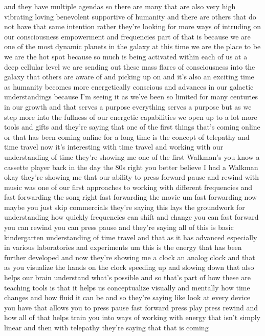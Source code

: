 \documentclass{article}
\begin{document}
and they have multiple agendas so there are many that are also very high
vibrating loving benevolent supportive of humanity and there are others
that do not have that same intention rather they're looking for more
ways of intruding on our consciousness empowerment and frequencies part
of that is because we are one of the most dynamic planets in the galaxy
at this time we are the place to be we are the hot spot because so much
is being activated within each of us at a deep cellular level we are
sending out these mass flares of consciousness into the galaxy that
others are aware of and picking up on and it's also an exciting time as
humanity becomes more energetically conscious and advances in our
galactic understandings because I'm seeing it as we've been so limited
for many centuries in our growth and that serves a purpose everything
serves a purpose but as we step more into the fullness of our energetic
capabilities we open up to a lot more tools and gifts and they're saying
that one of the first things that's coming online or that has been
coming online for a long time is the concept of telepathy and time
travel now it's interesting with time travel and working with our
understanding of time they're showing me one of the first Walkman's you
know a cassette player back in the day the 80s right you better believe
I had a Walkman okay they're showing me that our ability to press
forward pause and rewind with music was one of our first approaches to
working with different frequencies and fast forwarding the song right
fast forwarding the movie um fast forwarding now maybe you just skip
commercials they're saying this lays the groundwork for understanding
how quickly frequencies can shift and change you can fast forward you
can rewind you can press pause and they're saying all of this is basic
kindergarten understanding of time travel and that as it has advanced
especially in various laboratories and experiments um this is the energy
that has been further developed and now they're showing me a clock an
analog clock and that as you visualize the hands on the clock speeding
up and slowing down that also helps our brain understand what's possible
and so that's part of how these are teaching tools is that it helps us
conceptualize visually and mentally how time changes and how fluid it
can be and so they're saying like look at every device you have that
allows you to press pause fast forward press play press rewind and how
all of that helps train you into ways of working with energy that isn't
simply linear and then with telepathy they're saying that that is coming
\end{document}
